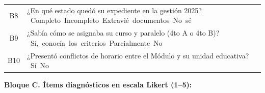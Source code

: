 \begin{table}[H]
\begin{tabularx}{\textwidth}{c L}
        \addlinespace
        B8 & ¿En qué estado quedó su expediente en la gestión 2025?\newline
            \mbox{\casilla{} Completo}\quad \mbox{\casilla{} Incompleto}\quad \mbox{\casilla{} Extravié documentos}\quad \mbox{\casilla{} No sé} \\
        \addlinespace
        B9 & ¿Sabía cómo se asignaba su curso y paralelo (4to A o 4to B)?\newline
            \mbox{\casilla{} Sí, conocía los criterios}\quad \mbox{\casilla{} Parcialmente}\quad \mbox{\casilla{} No} \\
        \addlinespace
        B10 & ¿Presentó conflictos de horario entre el Módulo y su unidad educativa?\newline
            \mbox{\casilla{} Sí}\quad \mbox{\casilla{} No} \\
        \bottomrule
    \end{tabularx}
\end{table}

\Needspace{22cm}
\noindent\textbf{Bloque C. Ítems diagnósticos en escala Likert (1--5):}

